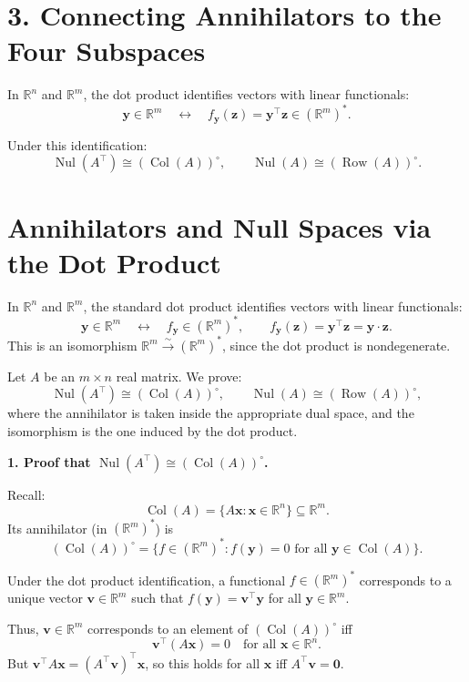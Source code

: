 \documentclass[11pt]{article}
\newcommand{\nul}{\operatorname{Nul}}
\newcommand{\col}{\operatorname{Col}}
\newcommand{\row}{\operatorname{Row}}
\begin{document}
\section*{3. Connecting Annihilators to the Four Subspaces}

In $ \mathbb{R}^n $ and $ \mathbb{R}^m $, the dot product identifies vectors with linear functionals:
\[
\mathbf{y} \in \mathbb{R}^m \quad \longleftrightarrow \quad f_{\mathbf{y}}(\mathbf{z}) = \mathbf{y}^\top \mathbf{z} \in (\mathbb{R}^m)^*.
\]

Under this identification:
\[
\operatorname{Nul}(A^\top) \cong (\operatorname{Col}(A))^\circ, \qquad
\operatorname{Nul}(A) \cong (\operatorname{Row}(A))^\circ.
\]





\section*{Annihilators and Null Spaces via the Dot Product}

In $\mathbb{R}^n$ and $\mathbb{R}^m$, the standard dot product identifies vectors with linear functionals:
\[
\mathbf{y} \in \mathbb{R}^m \quad \longleftrightarrow \quad f_{\mathbf{y}} \in (\mathbb{R}^m)^*, \qquad 
f_{\mathbf{y}}(\mathbf{z}) = \mathbf{y}^\top \mathbf{z} = \mathbf{y} \cdot \mathbf{z}.
\]
This is an isomorphism $\mathbb{R}^m \xrightarrow{\sim} (\mathbb{R}^m)^*$, since the dot product is nondegenerate.

Let $A$ be an $m \times n$ real matrix. We prove:
\[
\nul(A^\top) \cong (\col(A))^\circ, \qquad
\nul(A) \cong (\row(A))^\circ,
\]
where the annihilator is taken inside the appropriate dual space, and the isomorphism is the one induced by the dot product.

\medskip

\noindent\textbf{1. Proof that $\nul(A^\top) \cong (\col(A))^\circ$.}

Recall:
\[
\col(A) = \{ A\mathbf{x} : \mathbf{x} \in \mathbb{R}^n \} \subseteq \mathbb{R}^m.
\]
Its annihilator (in $(\mathbb{R}^m)^*$) is
\[
(\col(A))^\circ = \{ f \in (\mathbb{R}^m)^* : f(\mathbf{y}) = 0 \text{ for all } \mathbf{y} \in \col(A) \}.
\]

Under the dot product identification, a functional $f \in (\mathbb{R}^m)^*$ corresponds to a unique vector $\mathbf{v} \in \mathbb{R}^m$ such that $f(\mathbf{y}) = \mathbf{v}^\top \mathbf{y}$ for all $\mathbf{y} \in \mathbb{R}^m$.

Thus, $\mathbf{v} \in \mathbb{R}^m$ corresponds to an element of $(\col(A))^\circ$ iff
\[
\mathbf{v}^\top (A\mathbf{x}) = 0 \quad \text{for all } \mathbf{x} \in \mathbb{R}^n.
\]
But $\mathbf{v}^\top A \mathbf{x} = (A^\top \mathbf{v})^\top \mathbf{x}$, so this holds for all $\mathbf{x}$ iff $A^\top \mathbf{v} = \mathbf{0}$.
\end{document}
